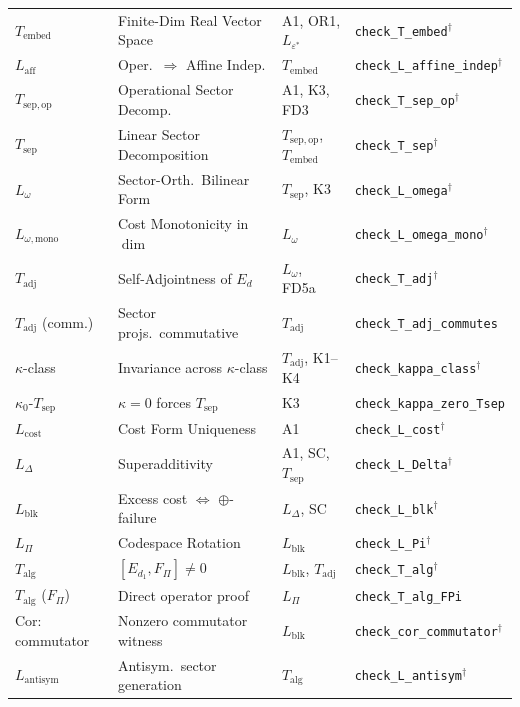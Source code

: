 \documentclass[11pt]{article}
\theoremstyle{remark}
\begin{document}
\begin{center}
\begin{tabular*}{\textwidth}{@{\extracolsep{\fill}}llll@{}}
$T_{\mathrm{embed}}$ & Finite-Dim Real Vector Space & A1, OR1, $L_{\varepsilon^*}$ & \texttt{check\_T\_embed}$^\dagger$ \\
$L_{\mathrm{aff}}$ & Oper.\ $\Rightarrow$ Affine Indep. & $T_{\mathrm{embed}}$ & \texttt{check\_L\_affine\_indep}$^\dagger$ \\
$T_{\mathrm{sep,op}}$ & Operational Sector Decomp. & A1, K3, FD3 & \texttt{check\_T\_sep\_op}$^\dagger$ \\
$T_{\mathrm{sep}}$ & Linear Sector Decomposition & $T_{\mathrm{sep,op}}$, $T_{\mathrm{embed}}$ & \texttt{check\_T\_sep}$^\dagger$ \\
$L_\omega$ & Sector-Orth.\ Bilinear Form & $T_{\mathrm{sep}}$, K3 & \texttt{check\_L\_omega}$^\dagger$ \\
$L_{\omega,\mathrm{mono}}$ & Cost Monotonicity in $\dim$ & $L_\omega$ & \texttt{check\_L\_omega\_mono}$^\dagger$ \\
$T_{\mathrm{adj}}$ & Self-Adjointness of $E_d$ & $L_\omega$, FD5a & \texttt{check\_T\_adj}$^\dagger$ \\
$T_{\mathrm{adj}}$ (comm.) & Sector projs.\ commutative & $T_{\mathrm{adj}}$ & \texttt{check\_T\_adj\_commutes} \\
$\kappa$-class & Invariance across $\kappa$-class & $T_{\mathrm{adj}}$, K1--K4 & \texttt{check\_kappa\_class}$^\dagger$ \\
$\kappa_0$-$T_{\mathrm{sep}}$ & $\kappa = 0$ forces $T_{\mathrm{sep}}$ & K3 & \texttt{check\_kappa\_zero\_Tsep} \\
$L_{\mathrm{cost}}$ & Cost Form Uniqueness & A1 & \texttt{check\_L\_cost}$^\dagger$ \\
$L_\Delta$ & Superadditivity & A1, SC, $T_{\mathrm{sep}}$ & \texttt{check\_L\_Delta}$^\dagger$ \\
$L_{\mathrm{blk}}$ & Excess cost $\Leftrightarrow$ $\oplus$-failure & $L_\Delta$, SC & \texttt{check\_L\_blk}$^\dagger$ \\
$L_\Pi$ & Codespace Rotation & $L_{\mathrm{blk}}$ & \texttt{check\_L\_Pi}$^\dagger$ \\
$T_{\mathrm{alg}}$ & $[E_{d_1}, F_\Pi]\!\ne\!0$ & $L_{\mathrm{blk}}$, $T_{\mathrm{adj}}$ & \texttt{check\_T\_alg}$^\dagger$ \\
$T_{\mathrm{alg}}$ ($F_\Pi$) & Direct operator proof & $L_\Pi$ & \texttt{check\_T\_alg\_FPi} \\
Cor: commutator & Nonzero commutator witness & $L_{\mathrm{blk}}$ & \texttt{check\_cor\_commutator}$^\dagger$ \\
$L_{\mathrm{antisym}}$ & Antisym.\ sector generation & $T_{\mathrm{alg}}$ & \texttt{check\_L\_antisym}$^\dagger$ \\

\end{tabular*}
\end{center}
\end{document}
